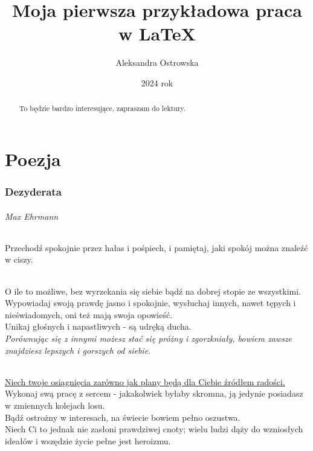 \documentclass[12pt]{article}
\begin{document}
\begin{titlepage}
\title{Moja pierwsza przykładowa praca w \LaTeX}
\author{Aleksandra Ostrowska}
\date{2024 rok}
\maketitle
\thispagestyle{empty}
\end{titlepage}

\begin{abstract}
To będzie bardzo interesujące, zapraszam do lektury.
\end{abstract}
\newpage

\part{Poezja}

\section{Dezyderata}
\paragraph{Max Ehrmann}
\paragraph{}
Przechodź spokojnie przez hałas i pośpiech, i pamiętaj, jaki spokój można znaleźć w ciszy.
\paragraph{}
O ile to możliwe, bez wyrzekania się siebie bądź na dobrej stopie ze wszystkimi.\\
Wypowiadaj swoją prawdę jasno i spokojnie, wysłuchaj innych, nawet tępych i nieświadomych, oni też mają swoja opowieść.\\
Unikaj głośnych i napastliwych - są udręką ducha.\\
\textit{Porównując się z innymi możesz stać się próżny i zgorzkniały, bowiem zawsze znajdziesz lepszych i gorszych od siebie.}
\paragraph{}
\underline{Niech twoje osiągnięcia zarówno jak plany będą dla Ciebie źródłem radości.}\\
Wykonaj swą pracę z sercem - jakakolwiek byłaby skromna, ją jedynie posiadasz
w zmiennych kolejach losu.\\
Bądź ostrożny w interesach, na świecie bowiem pełno oszustwa.\\
Niech Ci to jednak nie zasłoni prawdziwej cnoty; wielu ludzi dąży do wzniosłych ideałów
i wszędzie życie pełne jest heroizmu.
\end{document}
